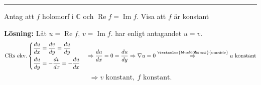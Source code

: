\noindent\rule{\linewidth}{0.4pt}

\begin{example}
Antag att $f$ holomorf i $\mathbb{C}$ och $\operatorname{Re} f = \operatorname{Im} f$. Visa att $f$ är konstant

\textbf{Lösning:} Låt $u = \operatorname{Re} f$, $v = \operatorname{Im} f$. har enligt antagandet $u = v$.
\[ \text{CRs ekv.} \begin{cases} \dfrac{du}{dx} = \dfrac{dv}{dy} = \dfrac{du}{dy} \\[2ex] \dfrac{du}{dy} = -\dfrac{dv}{dx} = -\dfrac{du}{dx} \end{cases} \Rightarrow \frac{du}{dx} = 0 = \frac{du}{dy} \Rightarrow \nabla u = 0 \overset{\textcolor{blue!60!black}{\text{område}}}{\Rightarrow} u \text{ konstant} \]
\[ \Rightarrow v \text{ konstant}, \ f \text{ konstant}. \]
\end{example}

